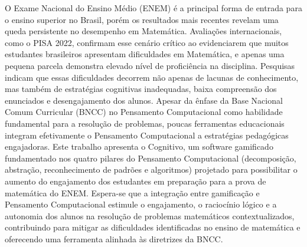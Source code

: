 O Exame Nacional do Ensino Médio (ENEM) é a principal forma de entrada para o
ensino superior no Brasil, porém os resultados mais recentes revelam uma queda
persistente no desempenho em Matemática. Avaliações internacionais, como o PISA
2022, confirmam esse cenário crítico ao evidenciarem que muitos estudantes
brasileiros apresentam dificuldades em Matemática, e apenas uma pequena parcela
demonstra elevado nível de proficiência na disciplina. Pesquisas indicam que
essas dificuldades decorrem não apenas de lacunas de conhecimento, mas também de
estratégias cognitivas inadequadas, baixa compreensão dos enunciados e
desengajamento dos alunos. Apesar da ênfase da Base Nacional Comum Curricular (BNCC) no
Pensamento Computacional como habilidade fundamental para a resolução de
problemas, poucas ferramentas educacionais integram efetivamente o Pensamento
Computacional a
estratégias pedagógicas engajadoras. Este trabalho apresenta o Cognitivo, um
software gamificado fundamentado nos quatro pilares do Pensamento Computacional (decomposição,
abstração, reconhecimento de padrões e algoritmos) projetado para possibilitar o
aumento do engajamento dos estudantes em preparação para a prova de matemática
do ENEM. Espera-se que a integração entre gamificação e Pensamento Computacional estimule o
engajamento, o raciocínio lógico e a autonomia dos alunos na resolução de
problemas matemáticos contextualizados, contribuindo para mitigar as
dificuldades identificadas no ensino de matemática e oferecendo uma ferramenta
alinhada às diretrizes da BNCC.

